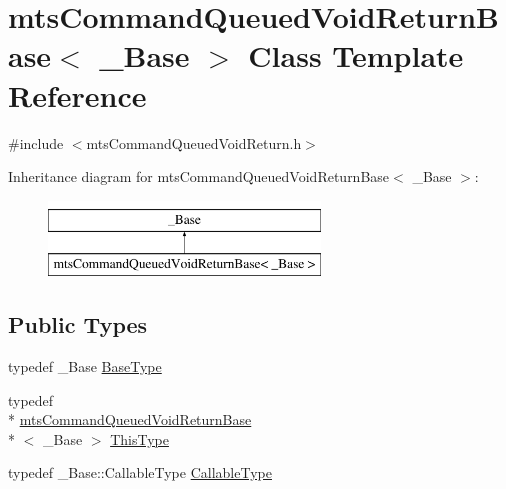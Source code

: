 \hypertarget{classmts_command_queued_void_return_base}{\section{mts\-Command\-Queued\-Void\-Return\-Base$<$ \-\_\-\-Base $>$ Class Template Reference}
\label{classmts_command_queued_void_return_base}
}


{\ttfamily \#include $<$mts\-Command\-Queued\-Void\-Return.\-h$>$}

Inheritance diagram for mts\-Command\-Queued\-Void\-Return\-Base$<$ \-\_\-\-Base $>$\-:\begin{figure}[H]
\begin{center}
\leavevmode
\includegraphics[height=2.000000cm]{d4/d6e/classmts_command_queued_void_return_base}
\end{center}
\end{figure}
\subsection*{Public Types}
\begin{DoxyCompactItemize}
\item 
typedef \-\_\-\-Base \hyperlink{classmts_command_queued_void_return_base_a29c68cf6ce656cb59012c2e8086c8f8d}{Base\-Type}
\item 
typedef \\*
\hyperlink{classmts_command_queued_void_return_base}{mts\-Command\-Queued\-Void\-Return\-Base}\\*
$<$ \-\_\-\-Base $>$ \hyperlink{classmts_command_queued_void_return_base_a336bb46e1c968dc3003f9dc163c9f82c}{This\-Type}
\item 
typedef \-\_\-\-Base\-::\-Callable\-Type \hyperlink{classmts_command_queued_void_return_base_a66e6a106a0c17625d9f0ec9a33ff634a}{Callable\-Type}
\end{DoxyCompactItemize}
